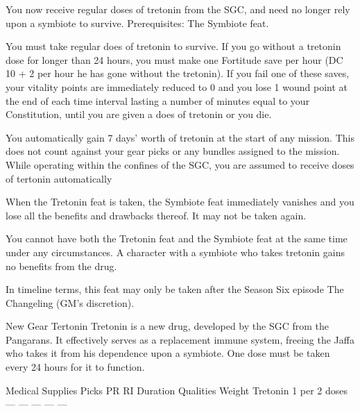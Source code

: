 

\descfeat
{You now receive regular doses of tretonin from the SGC, and need no longer rely upon a symbiote to survive.}
{Prerequisites: The Symbiote feat.}
{You must take regular does of tretonin to survive. If you go without a tretonin dose for longer than 24 hours, you must make one Fortitude save per hour (DC 10 + 2 per hour he has gone without the tretonin). If you fail one of these saves, your vitality points are immediately reduced to 0 and you lose 1 wound point at the end of each time interval lasting a number of minutes equal to your Constitution, until you are given a does of tretonin or you die.

You automatically gain 7 days’ worth of tretonin at the start of any mission. This does not count against your gear picks or any bundles assigned to the mission. While operating within the confines of the SGC, you are assumed to receive doses of tertonin automatically}
{When the Tretonin feat is taken, the Symbiote feat immediately vanishes and you lose all the benefits and drawbacks thereof. It may not be taken again.

You cannot have both the Tretonin feat and the Symbiote feat at the same time under any circumstances. A character with a symbiote who takes tretonin gains no benefits from the drug.

In timeline terms, this feat may only be taken after the Season Six episode The Changeling (GM’s discretion).}

New Gear
Tertonin
Tretonin is a new drug, developed by the SGC from the Pangarans. It effectively serves as a replacement immune system, freeing the Jaffa who takes it from his dependence upon a symbiote. One dose must be taken every 24 hours for it to function.

Medical Supplies	 Picks  	PR	RI	Duration	Qualities	Weight
Tretonin	1 per 2 doses	—	—	—	—	—
